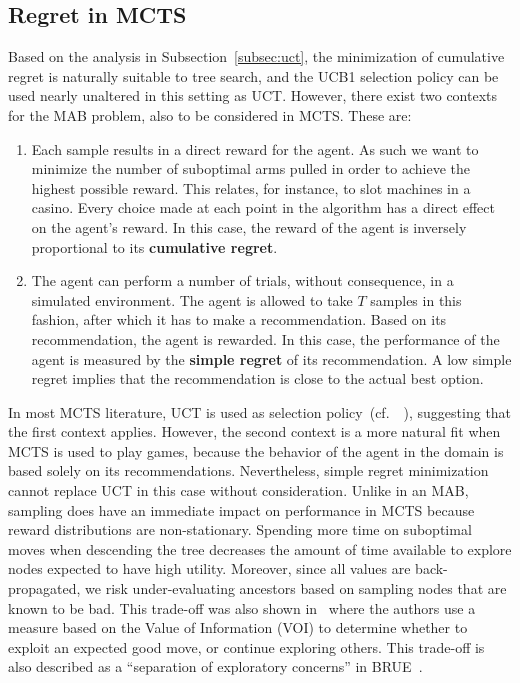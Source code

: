 \documentclass[a4paper]{llncs}
\newcommand{\cf}{{cf.}~}
\begin{document}
\subsection{Regret in MCTS}
\label{subsec:reg_mcts}

Based on the analysis in Subsection~\ref{subsec:uct}, the minimization of cumulative regret is naturally suitable to tree search, and the UCB1 selection policy can be used nearly unaltered in this setting as UCT. However, there exist two contexts for the MAB problem, also to be considered in MCTS. These are:

\begin{enumerate}

\item Each sample results in a direct reward for the agent. As such we want to minimize the number of suboptimal arms pulled in order to achieve the highest possible reward. This relates, for instance, to slot machines in a casino. Every choice made at each point in the algorithm has a direct effect on the agent's reward. In this case, the reward of the agent is inversely proportional to its \textbf{cumulative regret}.

\item The agent can perform a number of trials, without consequence, in a simulated environment. The agent is allowed to take $T$ samples in this fashion, after which it has to make a recommendation. Based on its recommendation, the agent is rewarded. In this case, the performance of the agent is measured by the \textbf{simple regret} of its recommendation. A low simple regret implies that the recommendation is close to the actual best option.

\end{enumerate}

In most MCTS literature, UCT is used as selection policy~(\cf~\cite{browne2012survey}), suggesting that the first context applies. However, the second context is a more natural fit when MCTS is used to play games, because the behavior of the agent in the domain is based solely on its recommendations. Nevertheless, simple regret minimization cannot replace UCT in this case without consideration. Unlike in an MAB, sampling does have an immediate impact on performance in MCTS because reward distributions are non-stationary. 
Spending more time on suboptimal moves when descending the tree decreases the amount of time available to explore nodes expected to have high utility. Moreover, since all values are back-propagated, we risk under-evaluating ancestors based on sampling nodes that are known to be bad. This trade-off was also shown in~\cite{tolpin2012mcts} where the authors use a measure based on the Value of Information (VOI) to determine whether to exploit an expected good move, or continue exploring others. This trade-off is also described as a ``separation of exploratory concerns'' in BRUE~\cite{Feldman12BRUE}.
\end{document}
